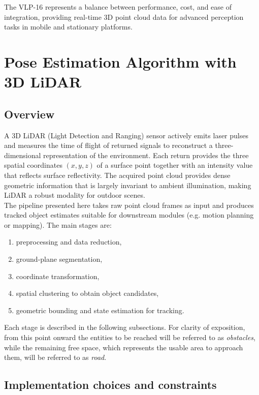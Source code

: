 \noindent The VLP-16 represents a balance between performance, cost, and ease of integration, providing real-time 3D point cloud data for advanced perception tasks in mobile and stationary platforms.

\section{Pose Estimation Algorithm with 3D LiDAR}

\subsection{Overview}

A 3D LiDAR (Light Detection and Ranging) sensor actively emits laser pulses and measures the time of flight of returned signals to reconstruct a three-dimensional representation 
of the environment. Each return provides the three spatial coordinates \((x,y,z)\) of a surface point together with an intensity value that reflects surface reflectivity. 
The acquired point cloud provides dense geometric information that is largely invariant to ambient illumination, making LiDAR a robust modality for outdoor scenes. \\

The pipeline presented here takes raw point cloud frames as input and produces tracked object estimates suitable for downstream modules (e.g. motion planning or mapping). 
The main stages are: \begin{enumerate}
    \item preprocessing and data reduction,
    \item ground-plane segmentation,
    \item coordinate transformation,
    \item spatial clustering to obtain object candidates,
    \item geometric bounding and state estimation for tracking.
\end{enumerate}
Each stage is described in the following subsections. For clarity of exposition, from this point onward the entities to be reached will be referred to as \emph{obstacles},
while the remaining free space, which represents the usable area to approach them, will be referred to as \emph{road}.

\subsection{Implementation choices and constraints}

